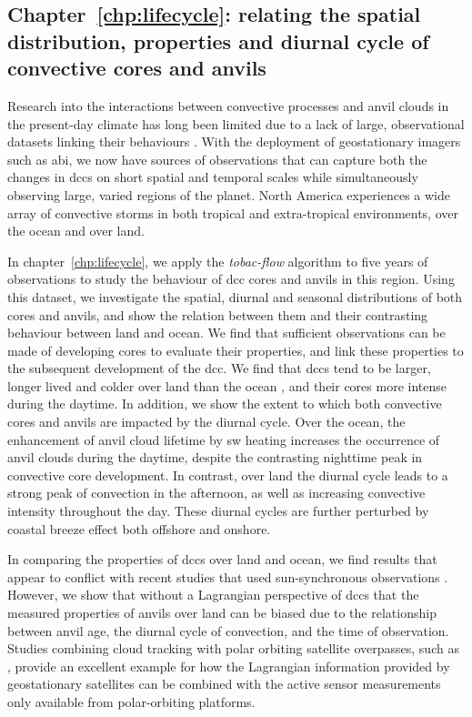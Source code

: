 \subsection{Chapter~\ref{chp:lifecycle}: relating the spatial distribution, properties and diurnal cycle of convective cores and anvils}

Research into the interactions between convective processes and anvil clouds in the present-day climate has long been limited due to a lack of large, observational datasets linking their behaviours \citep{gasparini_opinion_2023}.
With the deployment of geostationary imagers such as \acrshort{abi}, we now have sources of observations that can capture both the changes in \acrshort{dcc}s on short spatial and temporal scales while simultaneously observing large, varied regions of the planet.
North America experiences a wide array of convective storms in both tropical and extra-tropical environments, over the ocean and over land.

In chapter~\ref{chp:lifecycle}, we apply the \textit{tobac-flow} algorithm to five years of observations to study the behaviour of \acrshort{dcc} cores and anvils in this region. 
Using this dataset, we investigate the spatial, diurnal and seasonal distributions of both cores and anvils, and show the relation between them and their contrasting behaviour between land and ocean.
We find that sufficient observations can be made of developing cores to evaluate their properties, and link these properties to the subsequent development of the \acrshort{dcc}.
We find that \acrshort{dcc}s tend to be larger, longer lived and colder over land than the ocean , and their cores more intense during the daytime.
In addition, we show the extent to which both convective cores and anvils are impacted by the diurnal cycle.
Over the ocean, the enhancement of anvil cloud lifetime by \acrshort{sw} heating \citep{gasparini_diurnal_2022} increases the occurrence of anvil clouds during the daytime, despite the contrasting nighttime peak in convective core development.
In contrast, over land the diurnal cycle leads to a strong peak of convection in the afternoon, as well as increasing convective intensity throughout the day.
These diurnal cycles are further perturbed by coastal breeze effect both offshore and onshore.

In comparing the properties of \acrshort{dcc}s over land and ocean, we find results that appear to conflict with recent studies that used sun-synchronous observations \citep{ge_contrasting_2024}.
However, we show that without a Lagrangian perspective of \acrshort{dcc}s that the measured properties of anvils over land can be biased due to the relationship between anvil age, the diurnal cycle of convection, and the time of observation.
Studies combining cloud tracking with polar orbiting satellite overpasses, such as \citep{bouniol_life_2021}, provide an excellent example for how the Lagrangian information provided by geostationary satellites can be combined with the active sensor measurements only available from polar-orbiting platforms.

